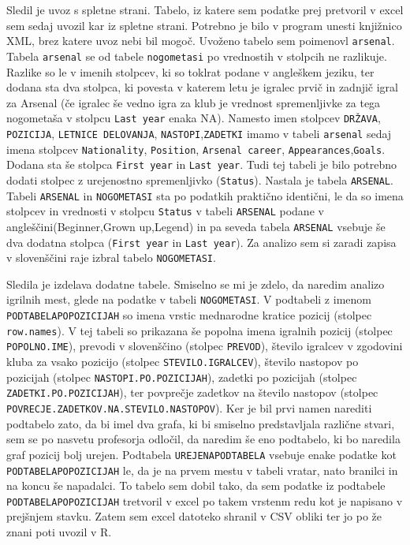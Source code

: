 \documentclass[11pt,a4paper]{article}
\begin{document}
Sledil je uvoz s spletne strani. Tabelo, iz katere sem podatke prej pretvoril v excel sem sedaj uvozil kar iz spletne strani. Potrebno je bilo v program unesti knjižnico XML, brez katere uvoz nebi bil mogoč. Uvoženo tabelo sem poimenovl \verb|arsenal|. Tabela \verb|arsenal| se od tabele \verb|nogometasi| po vrednostih v stolpcih ne razlikuje. Razlike so le v imenih stolpcev, ki so toklrat podane v angleškem jeziku, ter dodana sta dva stolpca, ki povesta v katerem letu je igralec prvič in zadnjič igral za Arsenal (če igralec še vedno igra za klub je vrednost spremenljivke za tega nogometaša v stolpcu \verb|Last year| enaka NA). Namesto imen stolpcev \verb|DRŽAVA|, \verb|POZICIJA|, \verb|LETNICE DELOVANJA|, \verb|NASTOPI|,\verb|ZADETKI| imamo v tabeli \verb|arsenal| sedaj imena stolpcev \verb|Nationality|, \verb|Position|, \verb|Arsenal career|, \verb|Appearances|,\verb|Goals|. Dodana sta še stolpca \verb|First year| in \verb|Last year|.   Tudi tej tabeli je bilo potrebno dodati stolpec z urejenostno spremenljivko (\verb|Status|). Nastala je tabela \verb|ARSENAL|. Tabeli \verb|ARSENAL| in \verb|NOGOMETASI| sta po podatkih praktično identični, le da so imena stolpcev in vrednosti v stolpcu  \verb|Status| v tabeli \verb|ARSENAL| podane v angleščini(Beginner,Grown up,Legend) in pa seveda tabela \verb|ARSENAL| vsebuje še dva dodatna stolpca (\verb|First year| in \verb|Last year|). Za analizo sem si zaradi zapisa v slovenščini raje izbral tabelo \verb|NOGOMETASI|.

Sledila je izdelava dodatne tabele. Smiselno se mi je zdelo, da naredim analizo igrilnih mest, glede na podatke v tabeli \verb|NOGOMETASI|. V podtabeli z imenom \verb|PODTABELAPOPOZICIJAH| so imena vrstic mednarodne kratice pozicij (stolpec \verb|row.names|). V tej tabeli so prikazana še popolna imena igralnih pozicij (stolpec \verb|POPOLNO.IME|), prevodi v slovenščino (stolpec \verb|PREVOD|), število igralcev v zgodovini kluba za vsako pozicijo (stolpec \verb|STEVILO.IGRALCEV|), število nastopov po pozicijah (stolpec \verb|NASTOPI.PO.POZICIJAH|), zadetki po pozicijah (stolpec \verb|ZADETKI.PO.POZICIJAH|), ter povprečje zadetkov na število nastopov (stolpec \verb|POVRECJE.ZADETKOV.NA.STEVILO.NASTOPOV|). Ker je bil prvi namen narediti podtabelo zato, da bi imel dva grafa, ki bi smiselno predstavljala različne stvari, sem se po nasvetu profesorja odločil, da naredim še eno podtabelo, ki bo naredila graf pozicij bolj urejen. Podtabela \verb|UREJENAPODTABELA| vsebuje enake podatke kot \verb|PODTABELAPOPOZICIJAH| le, da je na prvem mestu v tabeli vratar, nato branilci in na koncu še napadalci. To tabelo sem dobil tako, da sem podatke iz podtabele \verb|PODTABELAPOPOZICIJAH| tretvoril v excel po takem vrstenm redu kot je napisano v prejšnjem stavku. Zatem sem excel datoteko shranil v CSV obliki ter jo po že znani poti uvozil v R.
\end{document}
